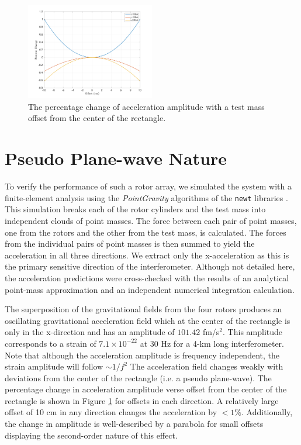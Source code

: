 \documentclass[superscriptaddress, twocolumn, prd]{revtex4-1}
\begin{document}
\begin{figure}[!h]
\centering \includegraphics[width=0.5\textwidth]{Super4_Offset.pdf}
\caption{The percentage change of acceleration amplitude with a test mass offset from the center of the rectangle.}
\label{offset} 
\end{figure}

\section{Pseudo Plane-wave Nature}

To verify the performance of such a rotor array, we simulated the system with a finite-element analysis using the \textit{PointGravity} algorithms of the \texttt{newt} libraries \cite{Hagedorn, pgURL}. This simulation breaks each of the rotor cylinders and the test mass into independent clouds of point masses. The force between each pair of point masses, one from the rotors and the other from the test mass, is calculated. The forces from the individual pairs of point masses is then summed to yield the acceleration in all three directions. We extract only the x-acceleration as this is the primary sensitive direction of the interferometer. Although not detailed here, the acceleration predictions were cross-checked with the results of an analytical point-mass approximation\cite{ncal} and an independent  numerical integration calculation.

The superposition of the gravitational fields from the four rotors produces an oscillating gravitational acceleration field which at the center of the rectangle is only in the x-direction and has an amplitude of $101.42$ fm/s$^2$. This amplitude corresponds to a strain of $7.1\times10^{-22}$ at 30 Hz for a 4-km long interferometer. Note that although the acceleration amplitude is frequency independent, the strain amplitude will follow $\sim1/f^2$  The acceleration field changes weakly with deviations from the center of the rectangle (i.e. a pseudo plane-wave). The percentage change in acceleration amplitude verse offset from the center of the rectangle is shown in Figure \ref{offset} for offsets in each direction. A relatively large offset of 10 cm in any direction changes the acceleration by $<1\%$. Additionally, the change in amplitude is well-described by a parabola for small offsets displaying the second-order nature of this effect. 
\end{document}
